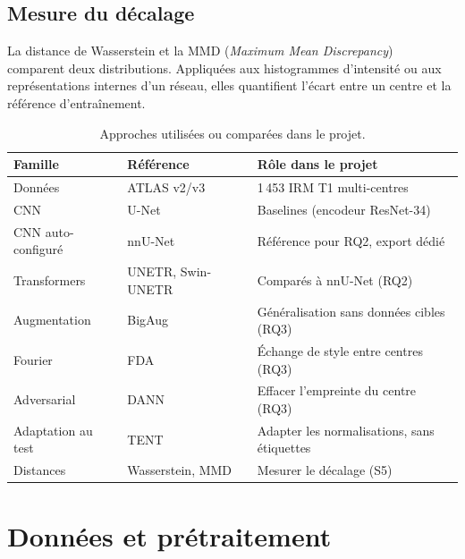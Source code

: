 \documentclass[11pt,a4paper]{report}
\begin{document}
\section{Mesure du décalage}

La distance de Wasserstein et la MMD (\emph{Maximum Mean
Discrepancy})~\cite{gretton2012} comparent deux distributions. Appliquées aux
histogrammes d'intensité ou aux représentations internes d'un réseau, elles
quantifient l'écart entre un centre et la référence d'entraînement.

\begin{table}[H]
  \centering
  \caption{Approches utilisées ou comparées dans le projet.}
  \label{tab:etat}
  \begin{tabularx}{\textwidth}{lXX}
    \toprule
    \textbf{Famille} & \textbf{Référence} & \textbf{Rôle dans le projet} \\
    \midrule
    Données          & ATLAS v2/v3~\cite{liew2018,liew2022} & 1\,453 IRM T1 multi-centres \\
    CNN              & U-Net~\cite{ronneberger2015} & Baselines (encodeur ResNet-34) \\
    CNN auto-configuré & nnU-Net~\cite{isensee2021} & Référence pour RQ2, export dédié \\
    Transformers     & UNETR, Swin-UNETR~\cite{hatamizadeh2022,hatamizadeh2022swin} & Comparés à nnU-Net (RQ2) \\
    Augmentation     & BigAug~\cite{zhang2020} & Généralisation sans données cibles (RQ3) \\
    Fourier          & FDA~\cite{yang2020} & Échange de style entre centres (RQ3) \\
    Adversarial      & DANN~\cite{ganin2016} & Effacer l'empreinte du centre (RQ3) \\
    Adaptation au test & TENT~\cite{wang2021} & Adapter les normalisations, sans étiquettes \\
    Distances        & Wasserstein, MMD~\cite{gretton2012} & Mesurer le décalage (S5) \\
    \bottomrule
  \end{tabularx}
\end{table}

\chapter{Données et prétraitement}
\label{chap:donnees}
\end{document}
